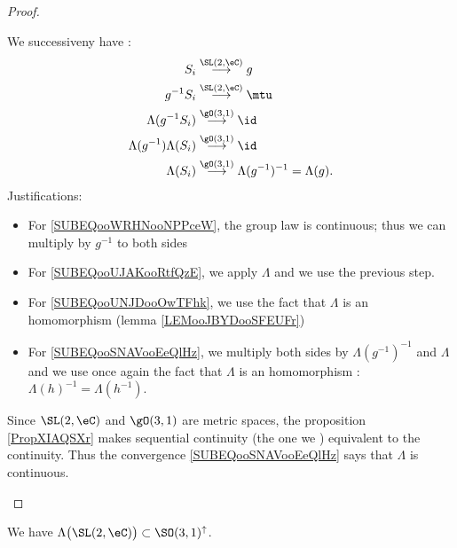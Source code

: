 \begin{proof}
\begin{subproof}
		We successiveny have :
		\begin{subequations}
			\begin{align}
				S_i                         & \stackrel{\SL(2,\eC)}{\longrightarrow}g     \label{SUBEQooPXXZooYJrxqk}                            \\
				g^{-1}S_i                   & \stackrel{\SL(2,\eC)}{\longrightarrow}\mtu        \label{SUBEQooWRHNooNPPceW}                      \\
				\Lambda(g^{-1} S_i)         & \stackrel{\gO(3,1)}{\longrightarrow}\id \label{SUBEQooUJAKooRtfQzE}                                \\
				\Lambda(g^{-1})\Lambda(S_i) & \stackrel{\gO(3,1)}{\longrightarrow}\id \label{SUBEQooUNJDooOwTFhk}                                \\
				\Lambda(S_i)                & \stackrel{\gO(3,1)}{\longrightarrow}\Lambda(g^{-1})^{-1}=\Lambda(g).   \label{SUBEQooSNAVooEeQlHz}
			\end{align}
		\end{subequations}
		Justifications:
		\begin{itemize}
			\item For \eqref{SUBEQooWRHNooNPPceW}, the group law is continuous; thus we can multiply by \( g^{-1}\) to both sides
			\item For \eqref{SUBEQooUJAKooRtfQzE}, we apply \( \Lambda\) and we use the previous step.
			\item For \eqref{SUBEQooUNJDooOwTFhk}, we use the fact that \( \Lambda\) is an homomorphism (lemma \ref{LEMooJBYDooSFEUFr})
			\item For \eqref{SUBEQooSNAVooEeQlHz}, we multiply both sides by \( \Lambda(g^{-1})^{-1}\) and \( \Lambda\) and we use once again the fact that \( \Lambda\) is an homomorphism : \( \Lambda(h)^{-1}=\Lambda(h^{-1})\).
		\end{itemize}
		Since \( \SL(2,\eC)\) and \( \gO(3,1)\) are metric spaces, the proposition \ref{PropXIAQSXr} makes sequential continuity (the one we ) equivalent to the continuity. Thus the convergence \eqref{SUBEQooSNAVooEeQlHz} says that \( \Lambda\) is continuous.
	\end{subproof}
\end{proof}


\begin{lemma}
	We have \( \Lambda\big( \SL(2,\eC) \big)\subset \SO(3,1)^{\uparrow}\).
\end{lemma}

